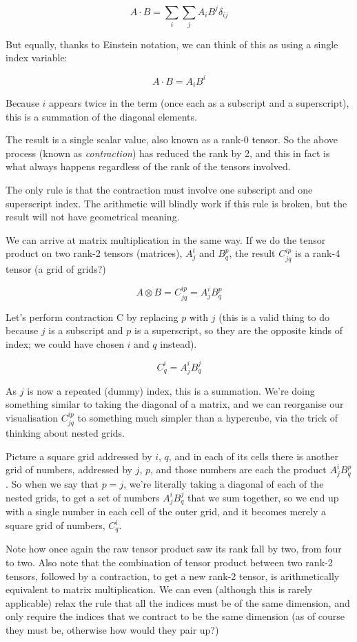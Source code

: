 $$A \cdot B = \sum_i\sum_j{A_iB^j\delta_{ij}}$$

But equally, thanks to Einstein notation, we can think of this as using a single index variable:

$$A \cdot B = A_iB^i$$

Because $i$ appears twice in the term (once each as a subscript and a superscript), this is a summation of the diagonal elements.

The result is a single scalar value, also known as a rank-0 tensor. So the above process (known as \textit{contraction}) has reduced the rank by 2, and this in fact is what always happens regardless of the rank of the tensors involved.

The only rule is that the contraction must involve one subscript and one superscript index. The arithmetic will blindly work if this rule is broken, but the result will not have geometrical meaning.

We can arrive at matrix multiplication in the same way. If we do the tensor product on two rank-2 tensors (matrices), $A^i_j$ and $B^p_q$, the result $C^{ip}_{jq}$ is a rank-4 tensor (a grid of grids?)

$$A \otimes B = C^{ip}_{jq} = A^i_jB^p_q$$

Let's perform contraction C by replacing $p$ with $j$ (this is a valid thing to do because $j$ is a subscript and $p$ is a superscript, so they are the opposite kinds of index; we could have chosen $i$ and $q$ instead).

$$C^i_q = A^i_jB^j_q$$

As $j$ is now a repeated (dummy) index, this is a summation. We're doing something similar to taking the diagonal of a matrix, and we can reorganise our visualisation $C^{ip}_{jq}$ to something much simpler than a hypercube, via the trick of thinking about nested grids.

Picture a square grid addressed by $i$, $q$, and in each of its cells there is another grid of numbers, addressed by $j$, $p$, and those numbers are each the product $A^i_jB^p_q$. So when we say that $p = j$, we're literally taking a diagonal of each of the nested grids, to get a set of numbers $A^i_jB^j_q$ that we sum together, so we end up with a single number in each cell of the outer grid, and it becomes merely a square grid of numbers, $C^i_q$.

Note how once again the raw tensor product saw its rank fall by two, from four to two. Also note that the combination of tensor product between two rank-2 tensors, followed by a contraction, to get a new rank-2 tensor, is arithmetically equivalent to matrix multiplication. We can even (although this is rarely applicable) relax the rule that all the indices must be of the same dimension, and only require the indices that we contract to be the same dimension (as of course they must be, otherwise how would they pair up?)

